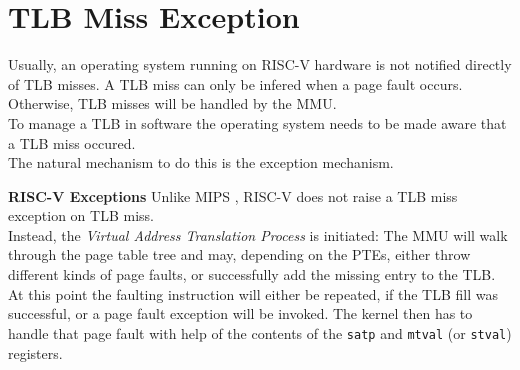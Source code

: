 

\section{TLB Miss Exception}
Usually, an operating system running on RISC-V hardware is not notified directly of TLB misses.
A TLB miss can only be infered when a page fault occurs. Otherwise, TLB misses will be handled
by the MMU.\\
To manage a TLB in software the operating system needs to be made aware that a TLB miss occured.\\
The natural mechanism to do this is the exception mechanism. 

\textbf{RISC-V Exceptions}
Unlike MIPS \cite{heiserAnatomyHighPerformanceMicrokernel}, RISC-V does not raise a TLB miss exception
on TLB miss.\\
Instead, the \emph{Virtual Address Translation Process} is initiated: The MMU will walk through
the page table tree and may, depending on the PTEs, either throw different kinds of page faults, or
successfully add the missing entry to the TLB.\\
At this point the faulting instruction will either be repeated, if the TLB fill was successful, or
a page fault exception will be invoked. The kernel then has to handle that page fault with help
of the contents of the \texttt{satp} and \texttt{mtval} (or \texttt{stval}) registers.

